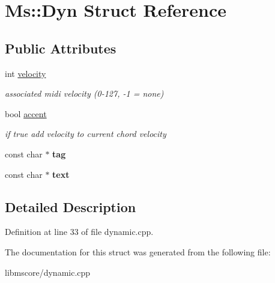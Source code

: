 \hypertarget{struct_ms_1_1_dyn}{}\section{Ms\+:\+:Dyn Struct Reference}
\label{struct_ms_1_1_dyn}
\subsection*{Public Attributes}
\begin{DoxyCompactItemize}
\item 
\mbox{\label{struct_ms_1_1_dyn_aed5a623311bca50e083664f573f0a1e3}} 
int \hyperlink{struct_ms_1_1_dyn_aed5a623311bca50e083664f573f0a1e3}{velocity}
\begin{DoxyCompactList}\small\item\em associated midi velocity (0-\/127, -\/1 = none) \end{DoxyCompactList}\item 
\mbox{\label{struct_ms_1_1_dyn_a82b250cd0ce86b792fd750f5c3fa42ec}} 
bool \hyperlink{struct_ms_1_1_dyn_a82b250cd0ce86b792fd750f5c3fa42ec}{accent}
\begin{DoxyCompactList}\small\item\em if true add velocity to current chord velocity \end{DoxyCompactList}\item 
\mbox{\label{struct_ms_1_1_dyn_aa228eb0884be21aa117b75012f060622}} 
const char $\ast$ {\bfseries tag}
\item 
\mbox{\label{struct_ms_1_1_dyn_aed6df5a6aad1b9dc4c3e51704fd88fb0}} 
const char $\ast$ {\bfseries text}
\end{DoxyCompactItemize}


\subsection{Detailed Description}


Definition at line 33 of file dynamic.\+cpp.



The documentation for this struct was generated from the following file\+:\begin{DoxyCompactItemize}
\item 
libmscore/dynamic.\+cpp\end{DoxyCompactItemize}
